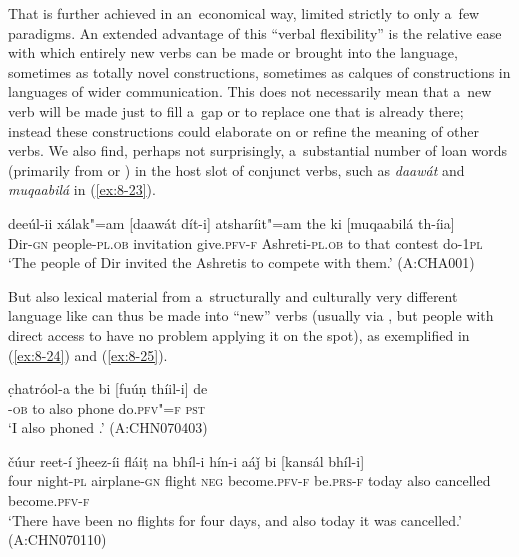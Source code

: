 That is further achieved in an~economical way, limited strictly to only a~few  paradigms. An extended advantage of this ``verbal flexibility'' is the relative ease with which entirely new verbs can be made or brought into the language, sometimes as totally novel constructions, sometimes as calques of  constructions in languages of wider communication. This does not necessarily mean that a~new verb will be made just to fill a~gap or to replace one that is already there; instead these constructions could elaborate on or refine the meaning of other verbs. We also find, perhaps not surprisingly, a~substantial number of loan words (primarily from  or ) in the host slot of conjunct verbs, such as \textit{daawát} and \textit{muqaabilá} in (\ref{ex:8-23}).

\begin{exe}
\ex
\label{ex:8-23}
\gll deeúl-ii xálak"=am [daawát dít-i] atsharíit"=am the ki [muqaabilá th-íia] \\
Dir-\textsc{gn} people-\textsc{pl.ob} invitation give.\textsc{pfv-f} Ashreti-\textsc{pl.ob} to that contest do-\textsc{1pl} \\
\glt `The people of Dir invited the Ashretis to compete with them.' (A:CHA001)
\end{exe}

But also lexical material from a~structurally and culturally very different language like  can thus be made into ``new'' verbs (usually via , but people with direct access to  have no problem applying it on the spot), as exemplified in (\ref{ex:8-24}) and (\ref{ex:8-25}).

\begin{exe}
\ex
\label{ex:8-24}
\gll c̣hatróol-a the bi [fuúṇ thíil-i] de \\
-\textsc{ob} to also phone do.\textsc{pfv"=f} \textsc{pst} \\
\glt `I also phoned .' (A:CHN070403)
\end{exe}
\begin{exe}
\ex
\label{ex:8-25}
\gll čúur reet-í ǰheez-íi fláiṭ na bhíl-i  hín-i aáǰ bi [kansál
  bhíl-i]  \\
four night-\textsc{pl} airplane-\textsc{gn} flight \textsc{neg} become.\textsc{pfv-f}  be.\textsc{prs-f} today also cancelled become.\textsc{pfv-f}  \\
\glt `There have been no flights for four days, and also today it was cancelled.' (A:CHN070110)
\end{exe}

